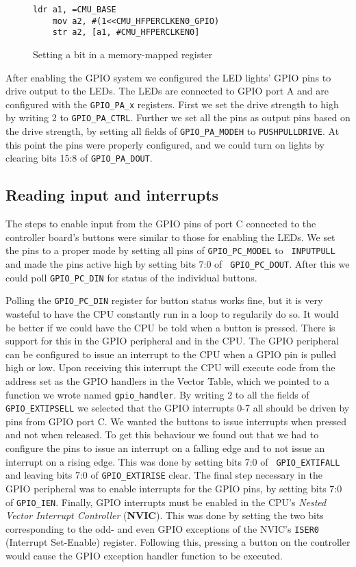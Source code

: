 \begin{figure}[h]
	\caption{Setting a bit in a memory-mapped register}
	\label{code:settingregister}
	\begin{lstlisting}[frame=single]
	ldr a1, =CMU_BASE
	mov a2, #(1<<CMU_HFPERCLKEN0_GPIO)
	str a2, [a1, #CMU_HFPERCLKEN0]
	\end{lstlisting}
\end{figure}

After enabling the GPIO system we configured the LED lights' GPIO pins to drive
output to the LEDs. The LEDs are connected to GPIO port A and are configured
with the {\tt GPIO\_PA\_x} registers. First we set the drive strength to high by
writing 2 to {\tt GPIO\_PA\_CTRL}. Further we set all the pins as output pins
based on the drive strength, by setting all fields of {\tt GPIO\_PA\_MODEH} to
{\tt PUSHPULLDRIVE}. At this point the pins were properly configured, and we
could turn on lights by clearing bits 15:8 of {\tt GPIO\_PA\_DOUT}.

\subsection{Reading input and interrupts}

The steps to enable input from the GPIO pins of port C connected to the
controller board's buttons were similar to those for enabling the LEDs. We set
the pins to a proper mode by setting all pins of {\tt GPIO\_PC\_MODEL} to {\tt
INPUTPULL} and made the pins active high by setting bits 7:0 of {\tt
GPIO\_PC\_DOUT}. After this we could poll {\tt GPIO\_PC\_DIN} for status of the
individual buttons.

Polling the {\tt GPIO\_PC\_DIN} register for button status works fine, but it is
very wasteful to have the CPU constantly run in a loop to regularily do so. It
would be better if we could have the CPU be told when a button is pressed. There
is support for this in the GPIO peripheral and in the CPU. The GPIO peripheral
can be configured to issue an interrupt to the CPU when a GPIO pin is pulled
high or low. Upon receiving this interrupt the CPU will execute code from the
address set as the GPIO handlers in the Vector Table, which we pointed to a
function we wrote named {\tt gpio\_handler}. By writing 2 to all the fields of
{\tt GPIO\_EXTIPSELL} we selected that the GPIO interrupts 0-7 all should be
driven by pins from GPIO port C. We wanted the buttons to issue interrupts when
pressed and not when released. To get this behaviour we found out that we had to
configure the pins to issue an interrupt on a falling edge and to not issue an
interrupt on a rising edge. This was done by setting bits 7:0 of {\tt
GPIO\_EXTIFALL} and leaving bits 7:0 of {\tt GPIO\_EXTIRISE} clear.  The final
step necessary in the GPIO peripheral was to enable interrupts for the GPIO
pins, by setting bits 7:0 of {\tt GPIO\_IEN}. Finally, GPIO interrupts must be
enabled in the CPU's \emph{Nested Vector Interrupt Controller} (\textbf{NVIC}).
This was done by setting the two bits corresponding to the odd- and even GPIO
exceptions of the NVIC's {\tt ISER0} (Interrupt Set-Enable) register. Following
this, pressing a button on the controller would cause the GPIO exception handler
function to be executed.


